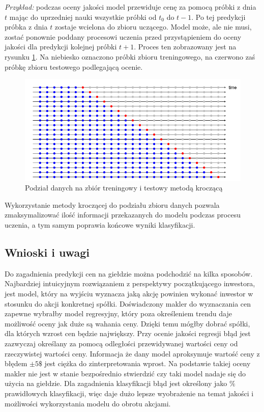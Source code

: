 \documentclass[a4paper, twoside, 11pt, openright]{article}
\begin{document}
\textit{Przykład:} podczas oceny jakości model przewiduje cenę za pomocą próbki z dnia $t$ mając do uprzedniej nauki wszystkie próbki od $t_0$ do $t-1$. Po tej predykcji próbka z dnia $t$ zostaje wcielona do zbioru uczącego. Model może, ale nie musi, zostać ponownie poddany procesowi uczenia przed przystąpieniem do oceny jakości dla predykcji kolejnej próbki $t+1$. Proces ten zobrazowany jest na rysunku \ref{train_test_split_time_series}. Na niebiesko oznaczono próbki zbioru treningowego, na czerwono zaś próbkę zbioru testowego podlegającą ocenie.

\begin{figure}[H]
\centering 
\includegraphics[scale=0.75]{img/train_test_split_time_series.png}
\caption{Podział danych na zbiór treningowy i testowy metodą kroczącą \cite{train_test_split_time_series}}
\label{train_test_split_time_series}
\end{figure}

Wykorzystanie metody kroczącej do podziału zbioru danych pozwala zmaksymalizować ilość informacji przekazanych do modelu podczas procesu uczenia, a tym samym poprawia końcowe wyniki klasyfikacji. 


\subsection{Wnioski i uwagi}

Do zagadnienia predykcji cen na giełdzie można podchodzić na kilka sposobów. Najbardziej intuicyjnym rozwiązaniem z perspektywy początkującego inwestora, jest model, który na wyjściu wyznacza jaką akcję powinien wykonać inwestor w stosunku do akcji konkretnej spółki. Doświadczony makler do wyznaczania cen zapewne wybrałby model regresyjny, który poza określeniem trendu daje możliwość oceny jak duże są wahania ceny. Dzięki temu mógłby dobrać spółki, dla których wzrost cen będzie największy. Przy ocenie jakości regresji błąd jest zazwyczaj określany za pomocą odległości przewidywanej wartości ceny od rzeczywistej wartości ceny. Informacja że dany model aproksymuje wartość ceny z błędem $\pm 5 \$$ jest ciężka do zinterpretowania wprost. Na podstawie takiej oceny makler nie jest w stanie bezpośrednio stwierdzić czy taki model nadaje się do użycia na giełdzie. Dla zagadnienia klasyfikacji błąd jest określony jako $\%$ prawidłowych klasyfikacji, więc daje dużo lepsze wyobrażenie na temat jakości i możliwości wykorzystania modelu do obrotu akcjami.
\end{document}
